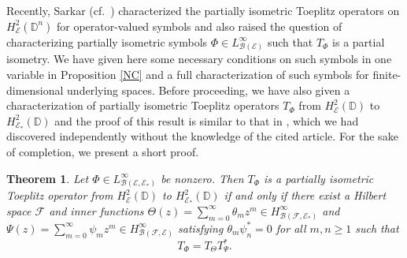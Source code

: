 \documentclass[12pt]{amsart}
\newcommand{\clb}{\mathcal{B}}
\newcommand{\cle}{\mathcal{E}}
\newcommand{\clf}{\mathcal{F}}
\newcommand{\D}{\mathbb{D}}
\theoremstyle{definition}
\theoremstyle{plain}
\newtheorem{thm}{Theorem}[section]
\theoremstyle{definition}
\numberwithin{equation}{section}
\begin{document}
Recently, Sarkar (cf.\ \cite{ss}) characterized the partially isometric Toeplitz operators on $H^2_{\cle}(\D^n)$ for operator-valued symbols and also raised the question of characterizing partially isometric symbols $\Phi\in L^\infty_{\clb(\cle)}$ such that $T_\Phi$ is a partial isometry.
We have given here  some necessary conditions on such symbols  in one variable in Proposition \ref{NC} and a full characterization of such symbols for finite-dimensional underlying spaces. Before proceeding, we have also given a characterization of partially isometric Toeplitz operators $T_\Phi$ from $H^2_\cle(\D)$ to $H^2_{\cle_*}(\D)$ and the proof of this result is similar to that in \cite{ss}, which we had discovered independently without the knowledge of the cited article. For the sake of completion, we present a short proof.



\begin{thm}\label{SSthm}
Let $\Phi\in L^\infty_{\clb(\cle,\cle_*)}$ be nonzero. Then $T_\Phi$ is a  partially isometric Toeplitz operator from $H^2_\cle(\D)$ to $H^2_{\cle_*}(\D)$ if and only if there exist a Hilbert space $\clf$ and inner functions $\Theta(z)=\sum\limits_{m=0}^\infty \theta_mz^m \in H^\infty_{\clb(\clf,\cle_*)}$ and  $\Psi(z)=\sum\limits_{m=0}^\infty \psi_m z^m\in H^\infty_{\clb(\clf,\cle)}$ satisfying $\theta_m\psi_n^*=0$ for all $m,n \geq 1$ such that 
\[
T_\Phi=T_{\Theta}T_{\Psi}^*.
\]
\end{thm}
\end{document}
